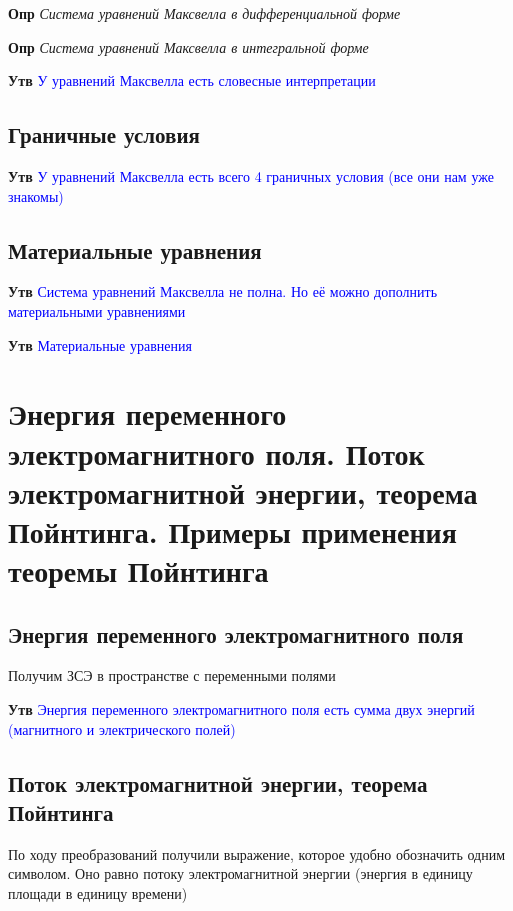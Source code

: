 \documentclass[a4paper, 14pt]{article}
\begin{document}
    \textbf{Опр} \textit{Система уравнений Максвелла в дифференциальной форме}
    
    \textbf{Опр} \textit{Система уравнений Максвелла в интегральной форме}
    
    \textbf{Утв} \textcolor{blue}{У уравнений Максвелла есть словесные интерпретации}
    
    \subsection{Граничные условия}
    
    \textbf{Утв} \textcolor{blue}{У уравнений Максвелла есть всего 4 граничных условия (все они нам уже знакомы)}
    
    \subsection{Материальные уравнения}
    
    \textbf{Утв} \textcolor{blue}{Система уравнений Максвелла не полна.
    Но её можно дополнить материальными уравнениями}
    
    \textbf{Утв} \textcolor{blue}{Материальные уравнения}
    
    \section{Энергия переменного электромагнитного поля.
    Поток электромагнитной энергии, теорема Пойнтинга.
    Примеры применения теоремы Пойнтинга}
    
    \subsection{Энергия переменного электромагнитного поля}
    
    Получим ЗСЭ в пространстве с переменными полями
    
    \textbf{Утв} \textcolor{blue}{Энергия переменного электромагнитного поля есть сумма двух энергий (магнитного и
    электрического полей)}
    
    \subsection{Поток электромагнитной энергии, теорема Пойнтинга}
    
    По ходу преобразований получили выражение, которое удобно обозначить одним символом.
    Оно равно потоку электромагнитной энергии (энергия в единицу площади в единицу времени)
    
\end{document}
